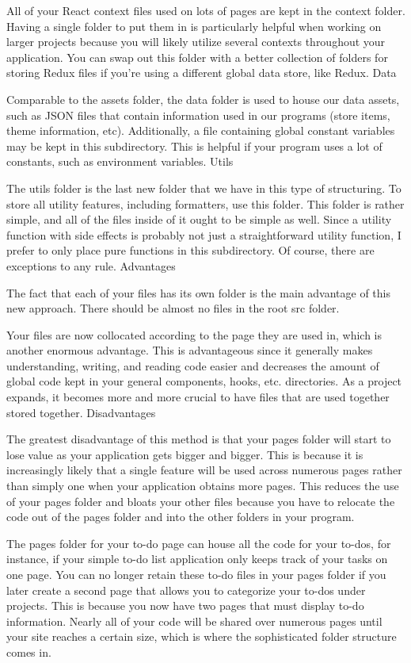 All of your React context files used on lots of pages are kept in the context folder. Having a single folder to put them in is particularly helpful when working on larger projects because you will likely utilize several contexts throughout your application. You can swap out this folder with a better collection of folders for storing Redux files if you're using a different global data store, like Redux.
Data

Comparable to the assets folder, the data folder is used to house our data assets, such as JSON files that contain information used in our programs (store items, theme information, etc). Additionally, a file containing global constant variables may be kept in this subdirectory. This is helpful if your program uses a lot of constants, such as environment variables.
Utils

The utils folder is the last new folder that we have in this type of structuring. To store all utility features, including formatters, use this folder. This folder is rather simple, and all of the files inside of it ought to be simple as well. Since a utility function with side effects is probably not just a straightforward utility function, I prefer to only place pure functions in this subdirectory. Of course, there are exceptions to any rule.
Advantages

The fact that each of your files has its own folder is the main advantage of this new approach. There should be almost no files in the root src folder.

Your files are now collocated according to the page they are used in, which is another enormous advantage. This is advantageous since it generally makes understanding, writing, and reading code easier and decreases the amount of global code kept in your general components, hooks, etc. directories. As a project expands, it becomes more and more crucial to have files that are used together stored together.
Disadvantages

The greatest disadvantage of this method is that your pages folder will start to lose value as your application gets bigger and bigger. This is because it is increasingly likely that a single feature will be used across numerous pages rather than simply one when your application obtains more pages. This reduces the use of your pages folder and bloats your other files because you have to relocate the code out of the pages folder and into the other folders in your program.

The pages folder for your to-do page can house all the code for your to-dos, for instance, if your simple to-do list application only keeps track of your tasks on one page. You can no longer retain these to-do files in your pages folder if you later create a second page that allows you to categorize your to-dos under projects. This is because you now have two pages that must display to-do information. Nearly all of your code will be shared over numerous pages until your site reaches a certain size, which is where the sophisticated folder structure comes in.


